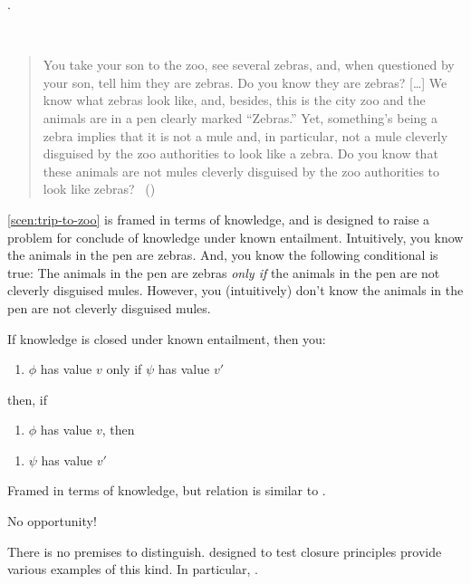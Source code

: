 \begin{note}
  \citeauthor{Dretske:1970to}.
  \begin{scenario}\mbox{ }
    \label{scen:trip-to-zoo}
    \vspace{-\baselineskip}
    \begin{quote}
      You take your son to the zoo, see several zebras, and, when questioned by your son, tell him they are zebras.
      Do you know they are zebras?
      [\dots]
      We know what zebras look like, and, besides, this is the city zoo and the animals are in a pen clearly marked ``Zebras.''
      Yet, something's being a zebra implies that it is not a mule and, in particular, not a mule cleverly disguised by the zoo authorities to look like a zebra.
      Do you know that these animals are not mules cleverly disguised by the zoo authorities to look like zebras?\newline
      \mbox{ }\hfill\mbox{(\citeyear[1015--1016]{Dretske:1970to})}
    \end{quote}
    \vspace{-\baselineskip}
  \end{scenario}

  \autoref{scen:trip-to-zoo} is framed in terms of knowledge, and is designed to raise a problem for conclude of knowledge under known entailment.
  Intuitively, you know the animals in the pen are zebras.
  And, you know the following conditional is true:
  The animals in the pen are zebras \emph{only if} the animals in the pen are not cleverly disguised mules.
  However, you (intuitively) don't know the animals in the pen are not cleverly disguised mules.

  If knowledge is closed under known entailment, then you:
  \begin{enumerate}
  \item \(\phi\) has value \(v\) only if \(\psi\) has value \(v'\)
  \end{enumerate}
  then, if
  \begin{enumerate}
  \item
    \(\phi\) has value \(v\), then
  \end{enumerate}
  \begin{enumerate}
  \item \(\psi\) has value \(v'\)
  \end{enumerate}

  Framed in terms of knowledge, but relation is similar to \requ{}.

  No opportunity!

  There is no premises to distinguish.
   designed to test closure principles provide various examples of this kind.
  In particular, \citeauthor{Wright:2011wn}.
\end{note}

